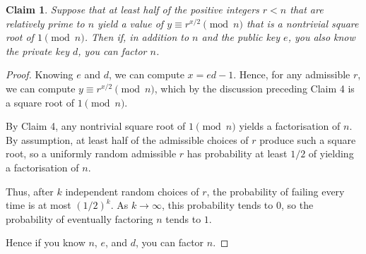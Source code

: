 \documentclass{article}
\newtheorem{claim}{Claim}
\begin{document}
\begin{claim} %
    Suppose that at least half of the positive integers $r < n$ that are relatively prime to $n$ yield a 
    value of $y \equiv r^{x/2} \pmod{n}$ that is a nontrivial square root of $1 \pmod{n}$. Then if, in 
    addition to $n$ and the public key $e$, you also know the private key $d$, you can factor $n$.
\end{claim}

\begin{proof}
    Knowing $e$ and $d$, we can compute $x = ed - 1$. Hence, for any admissible $r$, we can compute
    $y \equiv r^{x/2} \pmod{n}$, which by the discussion preceding Claim 4 is a square root of $1 \pmod{n}$.

    \medskip

    By Claim 4, any nontrivial square root of $1 \pmod{n}$ yields a factorisation of $n$. By assumption, at 
    least half of the admissible choices of $r$ produce such a square root, so a uniformly random admissible 
    $r$ has probability at least $1/2$ of yielding a factorisation of $n$.

    \medskip

    Thus, after $k$ independent random choices of $r$, the probability of failing every time is at most 
    $(1/2)^k$. As $k \to \infty$, this probability tends to $0$, so the probability of eventually factoring 
    $n$ tends to $1$.

    \medskip

    Hence if you know $n$, $e$, and $d$, you can factor $n$.
\end{proof}
\end{document}
